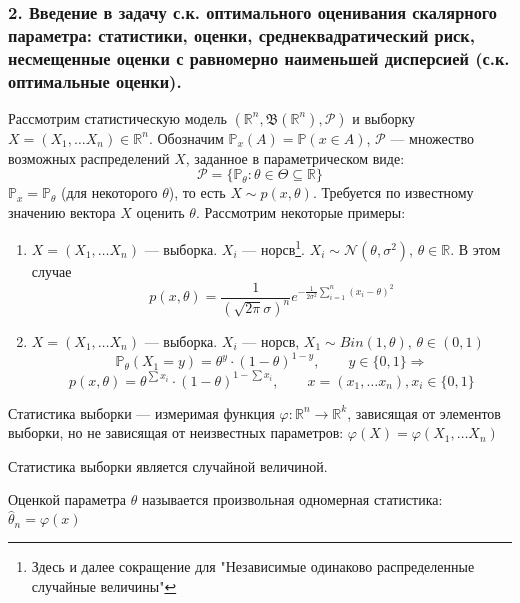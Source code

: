 \documentclass[12pt, russian]{article}
\begin{document}
\newpage
\subsubsection*{2. Введение в задачу с.к. оптимального оценивания скалярного параметра: статистики, оценки, среднеквадратический риск, несмещенные оценки с равномерно наименьшей дисперсией (с.к. оптимальные оценки).}

Рассмотрим статистическую модель $\left(\mathbb{R}^n, \mathfrak{B}(\mathbb{R}^n), \mathcal{P}\right)$ и выборку $X = (X_1, \ldots X_n) \in \mathbb{R}^n$. Обозначим $\mathbb{P}_x(A) = \mathbb{P}(x \in A)$, $\mathcal{P}$ --- множество возможных распределений $X$, заданное в параметрическом виде:
$$ \mathcal{P} = \{ \mathbb{P}_\theta : \theta \in \Theta \subseteq \mathbb{R} \} $$
$\mathbb{P}_x = \mathbb{P}_\theta$ (для некоторого $\theta$), то есть $X \sim p(x, \theta) $. Требуется по известному значению вектора $X$ оценить $\theta$.
Рассмотрим некоторые примеры: 
\begin{enumerate}
\item
$X = (X_1, \ldots X_n)$ --- выборка. $X_i$ --- норсв\footnote{Здесь и далее сокращение для "Независимые одинаково распределенные случайные величины"}. $X_i \sim \mathcal{N}(\theta, \sigma^2),\,\theta\in\mathbb{R}$. В этом случае
$$ p(x, \theta) = \frac{1}{(\sqrt{2\pi}\sigma)^n} e^{-\frac{1}{2\sigma^2} \sum\limits_{i=1}^n{(x_i - \theta)^2}}$$

\item $X = (X_1, \ldots X_n)$ --- выборка. $X_i$ --- норсв, $X_1 \sim Bin(1, \theta),\,\theta\in (0,1)$ 
$$ \mathbb{P}_\theta(X_1 = y) = \theta^y \cdot (1 - \theta)^{1 - y},\qquad y\in\{ 0, 1\} \Longrightarrow $$
$$ p(x, \theta) = \theta^{\sum{x_i}} \cdot (1 - \theta)^{1 - \sum{x_i}}, \qquad x=(x_1,\ldots x_n), x_i\in\{ 0, 1\} $$ 
\end{enumerate}

\begin{mydef}
Статистика выборки --- измеримая функция $\varphi : \mathbb{R}^n \rightarrow \mathbb{R}^k$, зависящая от элементов выборки, но не зависящая от неизвестных параметров: $\varphi(X) = \varphi(X_1, \ldots X_n)$
\end{mydef}

Статистика выборки является случайной величиной. 

\begin{mydef}
Оценкой параметра $\theta$ называется произвольная одномерная статистика: $\hat{\theta}_n = \varphi(x)$
\end{mydef}
\end{document}
